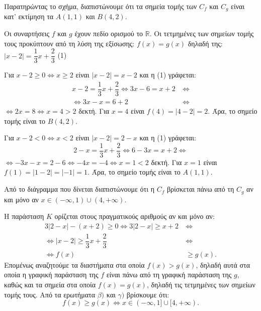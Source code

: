 
\begin{alist}
\item Παρατηρώντας το σχήμα, διαπιστώνουμε ότι τα σημεία τομής των $C_f$ και $C_g$ είναι κατ'
εκτίμηση τα $A(1, 1)$ και $B(4, 2)$.

\item Οι συναρτήσεις $f$ και $g$ έχουν πεδίο ορισμού το $\mathbb{R}$. Οι τετμημένες των σημείων τομής
τους προκύπτουν από τη λύση της εξίσωσης:
$f(x) = g(x)$
δηλαδή της:
$|x - 2| = \dfrac{1}{3}x + \dfrac{2}{3}$ (1)

Για $x - 2 \ge 0 \Leftrightarrow x \ge 2$ είναι $|x - 2| = x - 2$ και η (1) γράφεται:
\begin{align*}
x - 2 = \dfrac{1}{3}x + \dfrac{2}{3} \Leftrightarrow 3x - 6 = x + 2 \ &\Leftrightarrow \\
\Leftrightarrow 3x - x = 6 + 2 \ &\Leftrightarrow
\end{align*}
$\Leftrightarrow 2x = 8 \Leftrightarrow x = 4 > 2$ δεκτή.
Για $x = 4$ είναι $f(4) = |4 - 2| = 2$.
Άρα, το σημείο τομής είναι το $B(4, 2)$.

Για $x - 2 < 0 \Leftrightarrow x < 2$ είναι $|x - 2| = 2 - x$ και η (1) γράφεται:
\[2 - x = \dfrac{1}{3}x + \dfrac{2}{3} \Leftrightarrow 6 - 3x = x + 2 \Leftrightarrow\]
$\Leftrightarrow -3x - x = 2 - 6 \Leftrightarrow -4x = -4 \Leftrightarrow x = 1 < 2$ δεκτή.
Για $x = 1$ είναι $f(1) = |1 - 2| = |-1| = 1$.
Άρα, το σημείο τομής είναι το $A(1, 1)$.

\item Από το διάγραμμα που δίνεται διαπιστώνουμε ότι η $C_f$ βρίσκεται πάνω από τη $C_g$ αν και
μόνο αν $x \in (-\infty, 1) \cup (4, +\infty)$.

\item Η παράσταση $K$ ορίζεται στους πραγματικούς αριθμούς αν και μόνο αν:
\begin{align*}
3|2 - x| - (x + 2) \ge 0 \Leftrightarrow 3|2 - x| \ge x + 2 \ &\Leftrightarrow \\
\Leftrightarrow |x - 2| \ge \dfrac{1}{3}x + \dfrac{2}{3} \ &\Leftrightarrow \\
\Leftrightarrow f(x) &\ge g(x).
\end{align*}
Επομένως αναζητούμε τα διαστήματα στα οποία $f(x) > g(x)$, δηλαδή αυτά στα οποία η
γραφική παράσταση της $f$ είναι πάνω από τη γραφική παράσταση της $g$, καθώς και τα
σημεία στα οποία $f(x) = g(x)$, δηλαδή τις τετμημένες των σημείων τομής τους. Από τα
ερωτήματα $\beta)$ και $\gamma)$ βρίσκουμε ότι:
\[f(x) \ge g(x) \Leftrightarrow x \in (-\infty, 1] \cup [4, +\infty).\]
\end{alist}

